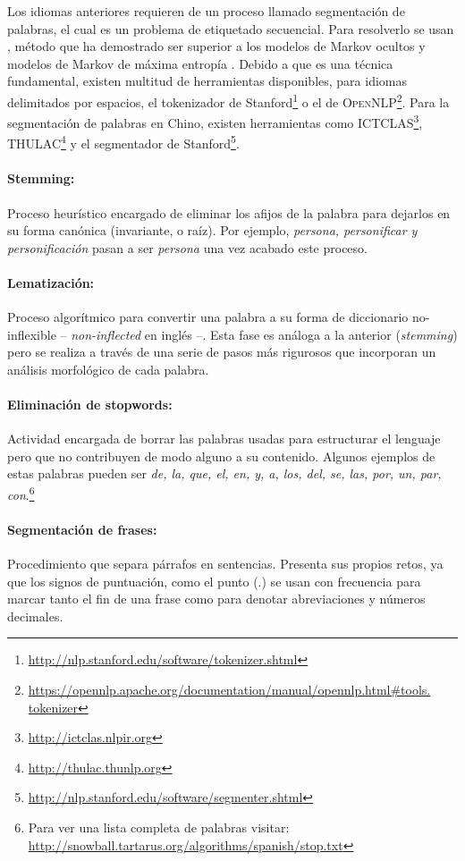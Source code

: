 Los idiomas anteriores requieren de un proceso llamado segmentación de palabras,
el cual es un problema de etiquetado secuencial. Para resolverlo se usan
, método que ha demostrado ser superior a los modelos de
Markov ocultos y modelos de Markov de máxima entropía \cite{Kudo04, tseng2005,
  Peng2004}. Debido a que es una técnica fundamental, existen multitud de
herramientas disponibles, para idiomas delimitados por espacios, el tokenizador
de Stanford\footnote{\url{http://nlp.stanford.edu/software/tokenizer.shtml}} o
el de
\textsc{OpenNLP}\footnote{\url{https://opennlp.apache.org/documentation/manual/opennlp.html\#tools.
    tokenizer}}. Para la segmentación de palabras en Chino, existen herramientas
como \textsc{ICTCLAS}\footnote{\url{http://ictclas.nlpir.org}},
\textsc{THULAC}\footnote{\url{http://thulac.thunlp.org}} y el segmentador de
Stanford\footnote{\url{http://nlp.stanford.edu/software/segmenter.shtml}}.

\paragraph{Stemming:}Proceso heurístico encargado de eliminar los afijos de la
palabra para dejarlos en su forma canónica (invariante, o raíz). Por ejemplo,
\emph{persona, personificar y personificación} pasan a ser \emph{persona} una
vez acabado este proceso.

\paragraph{Lematización:}Proceso algorítmico para convertir una palabra a su
forma de diccionario no-inflexible -- \emph{non-inflected} en inglés --. Esta
fase es análoga a la anterior (\emph{stemming}) pero se realiza a través de una
serie de pasos más rigurosos que incorporan un análisis morfológico de cada
palabra.

\paragraph{Eliminación de stopwords:} Actividad encargada de borrar las palabras
usadas para estructurar el lenguaje pero que no contribuyen de modo alguno a su
contenido. Algunos ejemplos de estas palabras pueden ser \emph{de, la, que, el,
  en, y, a, los, del, se, las, por, un, par, con}.\footnote{Para ver una lista
  completa de palabras visitar:
  \url{http://snowball.tartarus.org/algorithms/spanish/stop.txt}}

\paragraph{Segmentación de frases:}Procedimiento que separa párrafos en
sentencias. Presenta sus propios retos, ya que los signos de puntuación, como el
punto (.) se usan con frecuencia para marcar tanto el fin de una frase como para
denotar abreviaciones y números decimales.

